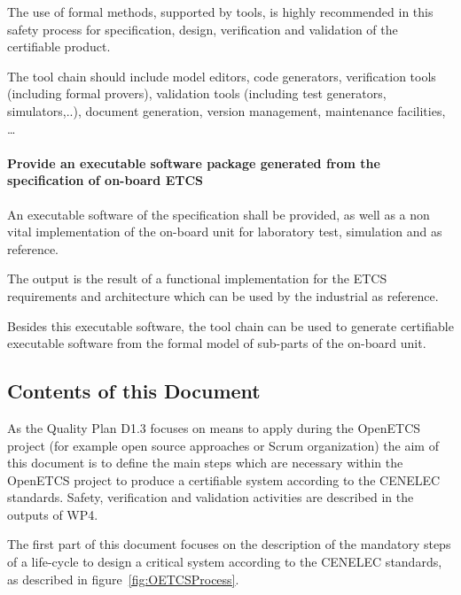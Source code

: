 The use of formal methods, supported by tools, is highly recommended in this safety process for specification, design, verification and validation of the certifiable product.

The tool chain should include model editors, code generators, verification tools (including formal provers), validation tools (including test generators, simulators,..), document generation, version management, maintenance facilities, \dots

\paragraph{Provide an executable software package generated from the specification of on-board ETCS}

An executable software of the specification shall be provided, as well as a non vital implementation of the on-board unit for laboratory test, simulation and as reference.

The output is the result of a functional implementation for the ETCS requirements and architecture which can be used by the industrial as reference.


Besides this executable software, the tool chain can be used to  generate certifiable executable software from the formal model of sub-parts of the on-board unit.


\subsection{Contents of this Document}

As the Quality Plan D1.3 focuses on means to apply during the OpenETCS project (for example open source approaches or Scrum organization) the aim of this document is to define the main steps which are necessary within the OpenETCS project to produce a certifiable system according to the CENELEC standards.
Safety, verification and validation activities are described in the outputs of WP4.


The first part of this document focuses on the description of the mandatory steps of a life-cycle to design a critical system according to the CENELEC standards, as described in figure~\ref{fig:OETCSProcess}.


